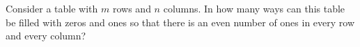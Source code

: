Consider a table with $m$ rows and $n$ columns.
In how many ways can this table be filled with zeros and ones so that
there is an even number of ones in every row and every column?